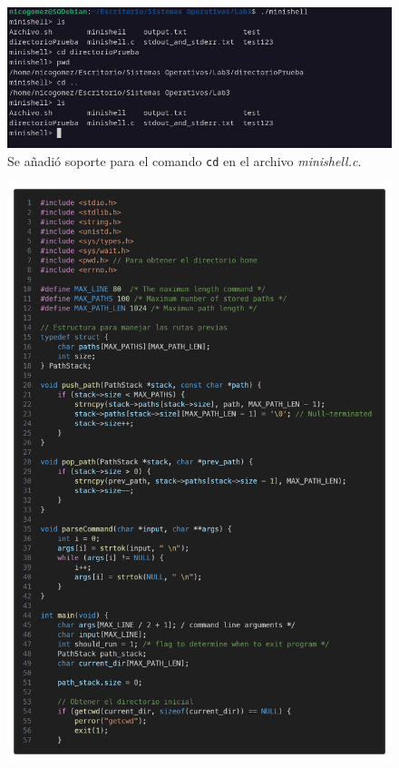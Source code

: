 \documentclass{templateNote}
\begin{document}
\begin{figure}[H]
    \centering
    \includegraphics[width=\textwidth]{img/ejerc5part4.png}
    \\Se añadió soporte para el comando \texttt{cd} en el archivo \textit{minishell.c}.
\end{figure}
\begin{figure}[H]
    \centering
    \includegraphics[width=\textwidth]{img/code1.png}
\end{figure}
\end{document}
